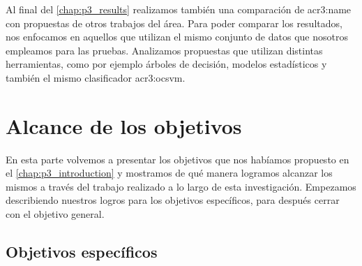 Al final del \autoref{chap:p3_results} realizamos también una comparación
de \gls{acr3:name} con propuestas de otros trabajos del área. Para poder
comparar los resultados, nos enfocamos en aquellos que utilizan el mismo
conjunto de datos que nosotros empleamos para las pruebas. Analizamos
propuestas que utilizan distintas herramientas, como por ejemplo árboles
de decisión, modelos estadísticos y también el mismo clasificador
\gls{acr3:ocsvm}.


\section{Alcance de los objetivos}

En esta parte volvemos a presentar los objetivos que nos habíamos propuesto
en el \autoref{chap:p3_introduction} y mostramos de qué manera logramos
alcanzar los mismos a través del trabajo realizado a lo largo de esta
investigación. Empezamos describiendo nuestros logros para los objetivos
específicos, para después cerrar con el objetivo general.


\subsection{Objetivos específicos}

